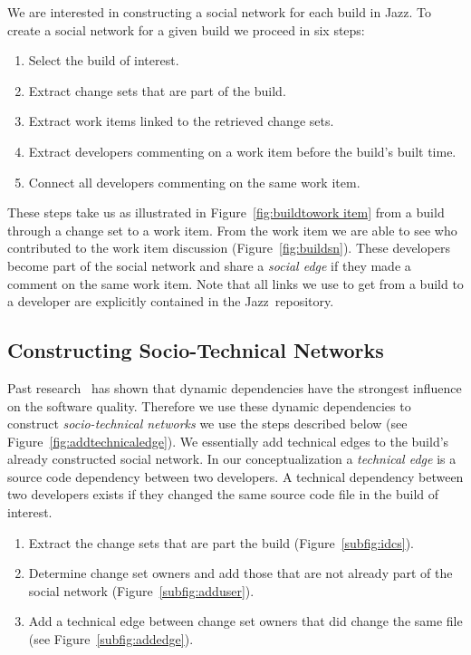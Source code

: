 We are interested in constructing a social network for each
build in Jazz\texttrademark. 
To create a social network for a given build we proceed in six steps:

\begin{enumerate}
\item Select the build of interest.
\item Extract change sets that are part of the build.
\item Extract work items linked to the retrieved change sets.
\item Extract developers commenting on a work item before the build's built time.
\item Connect all developers commenting on the same work item.
\end{enumerate}

These steps take us as illustrated in Figure~\ref{fig:buildtowork item}
from a build through a change set to a work item. From the work item we are able to
see who contributed to the work item discussion (Figure~\ref{fig:buildsn}).
These developers become part of the social network and
share a \emph{social edge} if they made a comment on the same work item.
Note that all links we use to get from a build to a developer are explicitly contained in
the Jazz\texttrademark\ repository.




\subsection{Constructing Socio-Technical Networks}
\label{subsec:technical}
Past research~\cite{nagappan:icse:2005} has shown that dynamic dependencies have the strongest influence on the software quality.
Therefore we use these dynamic dependencies
to construct \emph{socio-technical networks} we use the steps described below
(see Figure~\ref{fig:addtechnicaledge}). We essentially add technical edges to
the build's already constructed social network. In our conceptualization a \emph{technical edge} is a source code
dependency between two developers. A technical dependency between two developers
exists if they changed the same source code file in the build of interest. 

\begin{enumerate}
\item Extract the change sets that are part the build (Figure~\ref{subfig:idcs}).
\item Determine change set owners and add those  that are not already part
of the social network (Figure~\ref{subfig:adduser}).
\item Add a technical edge between change set owners that did change the same file (see Figure~\ref{subfig:addedge}).
\end{enumerate}


